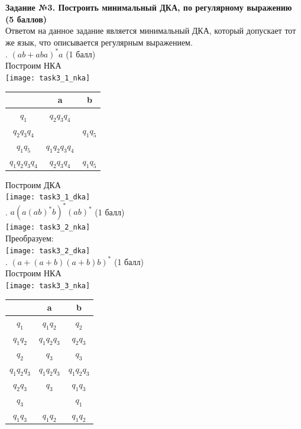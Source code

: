 \documentclass{article}
\begin{document}
\newpage
\textbf{\Large Задание №3. Построить минимальный ДКА, по регулярному выражению (5 баллов)}\\
\hfill \break
\normalsize{Ответом на данное задание является минимальный ДКА, который допускает тот же язык, что описывается регулярным выражением.}\\
\hfill {}. \((ab + aba)^*a\) (1 балл)\\
\hfill \break
\normalsize{Построим  НКА}\\
\hfill \break
\texttt{[image: task3\_1\_nka]}\\
\begin{center}
\begin{tabular} {|c |c |c|}
\hline
 & a & b \\
\hline
\(q_1\) & \(q_2q_3q_4\) & \(\) \\
\hline
\(q_2q_3q_4\) & \(\) & \(q_1q_5\) \\
\hline
\(q_1q_5\) & \(q_1q_2q_3q_4\) & \(\) \\
\hline
\(q_1q_2q_3q_4\) & \(q_2q_3q_4\) & \(q_1q_5\) \\
\hline
\end{tabular}
\end{center}
\normalsize{Построим  ДКА}\\
\texttt{[image: task3\_1\_dka]}\\
\hfill {}. \(a(a(ab)^*b)^*(ab)^*\) (1 балл)\\
\hfill \break
\hfill \break
\texttt{[image: task3\_2\_nka]}\\
\normalsize{Преобразуем:}\\
\hfill \break
\texttt{[image: task3\_2\_dka]}\\
\hfill {}. \((a + (a + b)(a + b)b)^*\) (1 балл)\\
\hfill \break
\normalsize{Построим  НКА}\\
\hfill \break
\texttt{[image: task3\_3\_nka]}\\
\hfill \break
\begin{center}
\begin{tabular} {|c |c |c|}
\hline
 & a & b \\
\hline
\(q_1\) & \(q_1q_2\) & \(q_2\) \\
\hline
\(q_1q_2\) & \(q_1q_2q_3\) & \(q_2q_3\) \\
\hline
\(q_2\) & \(q_3\) & \(q_3\) \\
\hline
\(q_1q_2q_3\) & \(q_1q_2q_3\) & \(q_1q_2q_3\) \\
\hline
\(q_2q_3\) & \(q_3\) & \(q_1q_3\) \\
\hline
\(q_3\) & \(\) & \(q_1\) \\
\hline
\(q_1q_3\) & \(q_1q_2\) & \(q_1q_2\) \\
\hline
\end{tabular}
\end{center}
\end{document}
